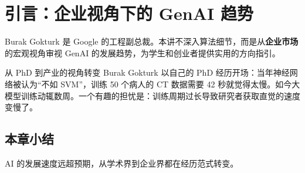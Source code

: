 \section{引言：企业视角下的 GenAI 趋势}

Burak Gokturk 是 Google 的工程副总裁。本讲不深入算法细节，而是从\textbf{企业市场}的宏观视角审视 GenAI 的发展趋势，为学生和创业者提供实用的方向指引。

\begin{knowledgebox}{从 PhD 到产业的视角转变}
Burak Gokturk 以自己的 PhD 经历开场：当年神经网络被认为``不如 SVM''，训练 50 个病人的 CT 数据需要 42 秒就觉得太慢。如今大模型训练动辄数周。一个有趣的担忧是：训练周期过长导致研究者获取直觉的速度变慢了。
\end{knowledgebox}

\subsection{本章小结}

AI 的发展速度远超预期，从学术界到企业界都在经历范式转变。

